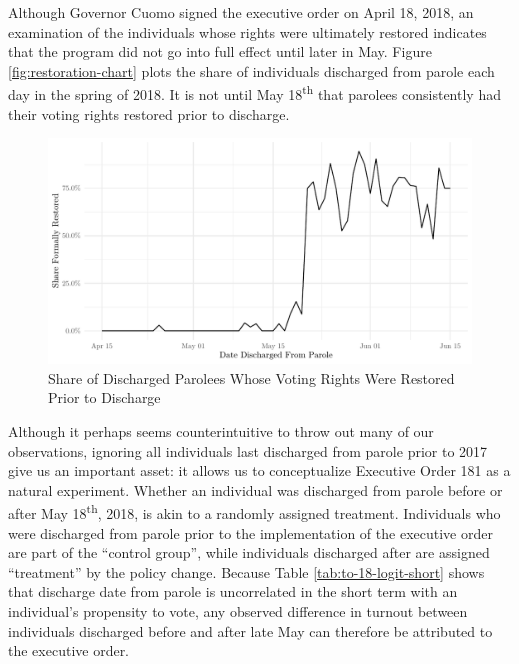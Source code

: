 \documentclass[
  12pt,
]{article}
\begin{document}
Although Governor Cuomo signed the executive order on April 18, 2018, an examination of the individuals whose rights were ultimately restored indicates that the program did not go into full effect until later in May. Figure \ref{fig:restoration-chart} plots the share of individuals discharged from parole each day in the spring of 2018. It is not until May 18\textsuperscript{th} that parolees consistently had their voting rights restored prior to discharge.

\begin{figure}[H]

{\centering \includegraphics{felony_disenfranchisement_nys_files/figure-latex/restoration-chart-chunk-1} 

}

\caption{\label{fig:restoration-chart}Share of Discharged Parolees Whose Voting Rights Were Restored Prior to Discharge}\label{fig:restoration-chart-chunk}
\end{figure}

Although it perhaps seems counterintuitive to throw out many of our observations, ignoring all individuals last discharged from parole prior to 2017 give us an important asset: it allows us to conceptualize Executive Order 181 as a natural experiment. Whether an individual was discharged from parole before or after May 18\textsuperscript{th}, 2018, is akin to a randomly assigned treatment. Individuals who were discharged from parole prior to the implementation of the executive order are part of the ``control group'', while individuals discharged after are assigned ``treatment'' by the policy change. Because Table \ref{tab:to-18-logit-short} shows that discharge date from parole is uncorrelated in the short term with an individual's propensity to vote, any observed difference in turnout between individuals discharged before and after late May can therefore be attributed to the executive order.
\end{document}
